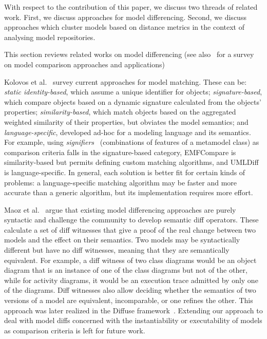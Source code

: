With respect to the contribution of this paper, we discuss two threads of related work. First, we discuss approaches for model differencing. Second, we discuss approaches which cluster models based on distance metrics in the context of analysing model repositories.



This section reviews related works on model differencing (see also~\cite{StephanC13} for a survey on
model comparison approaches and applications)

Kolovos et al.~\cite{Kolovos2009} survey current approaches for model matching. These can be: {\em static identity-based}, 
which assume a unique identifier for objects; {\em signature-based}, which compare objects based on a dynamic signature 
calculated from the objects' properties; {\em similarity-based}, which match objects based on the aggregated 
weighted similarity of their properties, but obviates the model semantics; and {\em language-specific}, developed 
ad-hoc for a modeling language and its semantics. For example, using {\em signifiers}~\cite{LangerWGKV12} 
(\ie combinations of features of a metamodel class) as comparison criteria falls in the signature-based category, 
EMFCompare is similarity-based but permits defining custom matching algorithms, and UMLDiff is language-specific. 
In general, each solution is better fit for certain kinds of problems: a language-specific matching algorithm may 
be faster and more accurate than a generic algorithm, but its implementation requires more effort.

Maoz et al.~\cite{MaozRR10} argue that existing model differencing approaches are purely syntactic and 
challenge the community to develop semantic diff operators. These calculate a set of diff witnesses that give 
a proof of the real change between two models and the effect on their semantics. Two models may be syntactically 
different but have no diff witnesses, meaning that they are semantically equivalent. For example, a diff witness 
of two class diagrams would be an object diagram that is an instance of one of the class diagrams but not of 
the other, while for activity diagrams, it would be an execution trace admitted by only one of the diagrams. 
Diff witnesses also allow deciding whether the semantics of two versions of a model are equivalent, incomparable, 
or one refines the other. This approach was later realized in the Diffuse framework~\cite{MaozR18}.
Extending our approach to deal with model diffs concerned with the instantiability or 
executability of models as comparison criteria is left for future work.

